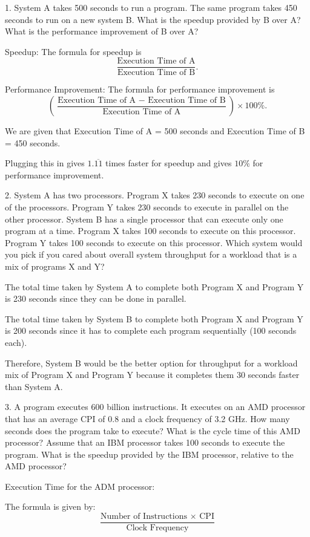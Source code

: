 \documentclass{article}
\begin{document}
1. System A takes 500 seconds to run a program. The same program
takes 450 seconds to run on a new system B. What is the
speedup provided by B over A? What is the performance improvement of B over A?

Speedup: The formula for speedup is
\[\frac{\text{Execution Time of A}}{\text{Execution Time of B}}.\]

Performance Improvement: The formula for performance improvement is
\[\left(\frac{\text{Execution Time of A $-$ Execution Time of B}}{\text{Execution Time of A}}\right) \times 100\%.\]

We are given that Execution Time of A = 500 seconds and
Execution Time of B = 450 seconds.

Plugging this in gives $1. \overline{11}$ times faster for speedup and gives $10\%$
for performance improvement.


2. System A has two processors. Program X takes 230 seconds to execute on one
of the processors. Program Y takes 230 seconds to execute in parallel on the
other processor. System B has a single processor that can execute only one program at a time.
Program X takes 100 seconds to execute on this processor. Program Y takes 100 seconds to execute
on this processor. Which system would you pick if you cared about overall system throughput
for a workload that is a mix of programs X and Y?

The total time taken by System A to complete both Program X and Program Y
is 230 seconds since they can be done in parallel.

The total time taken by System B to complete both Program X and Program Y
is 200 seconds since it has to complete each program sequentially (100 seconds each).

Therefore, System B would be the better option for throughput for a workload mix of
Program X and Program Y because it completes them 30 seconds faster than System A.


3. A program executes 600 billion instructions. It executes on an AMD processor that has
an average CPI of 0.8 and a clock frequency of 3.2 GHz. How many seconds does the program
take to execute? What is the cycle time of this AMD processor? Assume that an IBM processor takes
100 seconds to execute the program. What is the speedup provided by the IBM processor, relative to the AMD processor?

Execution Time for the ADM processor:

The formula is given by: \[\frac{\text{Number of Instructions $\times$ CPI}}{\text{Clock Frequency}}\]
\end{document}
